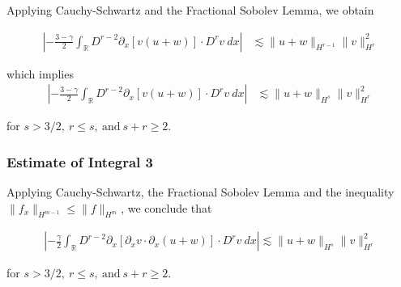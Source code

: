 \documentclass{beamer}
\numberwithin{equation}{section}
\newcommand{\rr}{\mathbb{R}}
\newcommand{\p}{\partial}
\begin{document}
\begin{frame}


Applying Cauchy-Schwartz and the Fractional Sobolev Lemma, we obtain



\begin{equation*}
\begin{split}
\left | - \frac{3-\gamma}{2} \int_{\rr}  D^{r -2}
\p_x[v(u+w)] \cdot
D^r v \ dx  \right |
 & \lesssim \|u+w\|_{H^{r -1}} \|v\|_{H^r}^2
\end{split}
\end{equation*}

\pause

which implies
\begin{equation*}
\begin{split}
\left | - \frac{3-\gamma}{2} \int_{\rr}  D^{r -2}
\p_x[v(u+w)] \cdot
D^r v \ dx  \right |
 & \lesssim \|u+w\|_{H^{s}} \|v\|_{H^r}^2
 \label{3v}
\end{split}
\end{equation*}

for $s > 3/2, \ r \le s, \ \text{and} \ s + r \ge 2$.

\end{frame}
\begin{frame}
\frametitle{Estimate of Integral 3} 

Applying Cauchy-Schwartz, the Fractional Sobolev Lemma and the inequality $\| f_{x}
\|_{H^{m-1}} \le \| f \|_{H^{m}}$,  we conclude that

\begin{equation*}
\begin{split}
\left | - \frac{\gamma}{2} \int_{\rr} D^{r 
-2} \p_x [ \p_x v
\cdot \p_x (u+w)]\cdot D^r v \ dx \right | 
 \lesssim \|u+w \|_{H^{s}}
\|v\|_{H^r}^2
\label{3'v}
\end{split}
\end{equation*}


for $s > 3/2, \ r \le s, \ \text{and} \ s + r \ge 2$.
\end{frame}
\end{document}
